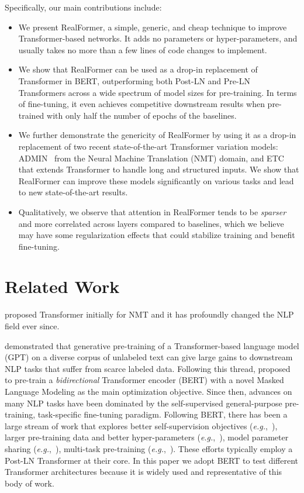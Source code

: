 \documentclass[11pt,a4paper]{article}
\begin{document}
Specifically, our main contributions include:
\begin{itemize}
\item We present RealFormer, a simple, generic, and cheap technique to improve Transformer-based networks. It adds no parameters or hyper-parameters, and usually takes no more than a few lines of code changes to implement.
\item We show that RealFormer can be used as a drop-in replacement of Transformer in BERT, outperforming both Post-LN and Pre-LN Transformers across a wide spectrum of model sizes for pre-training. In terms of fine-tuning, it even achieves competitive downstream results when pre-trained with only half the number of epochs of the baselines.
\item We further demonstrate the genericity of RealFormer by using it as a drop-in replacement of two recent state-of-the-art Transformer variation models: ADMIN~\citep{Liu-2020-admin} from the Neural Machine Translation (NMT) domain, and ETC~\citep{Ainslie-2020-etc} that extends Transformer to handle long and structured inputs. We show that RealFormer can improve these models significantly on various tasks and lead to new state-of-the-art results.
\item Qualitatively, we observe that attention in RealFormer tends to be \emph{sparser} and more correlated across layers compared to baselines, which we believe may have some regularization effects that could stabilize training and benefit fine-tuning.
\end{itemize}


\section{Related Work}
\citet{Vaswani-2017-attention} proposed Transformer initially for NMT and it has profoundly changed the NLP field ever since. 

\citet{Radford-2018-gpt1} demonstrated that generative pre-training of a Transformer-based language model (GPT) on a diverse corpus of unlabeled text can give large gains to downstream NLP tasks that suffer from scarce labeled data. Following this thread, \citet{Devlin-2019-bert} proposed to pre-train a \emph{bidirectional} Transformer encoder (BERT) with a novel Masked Language Modeling as the main optimization objective. Since then, advances on many NLP tasks have been dominated by the self-supervised general-purpose pre-training, task-specific fine-tuning paradigm.
Following BERT, there has been a large stream of work that explores better self-supervision objectives (\emph{e.g.},~\citet{Yang-2019-xlnet,Clark-2020-electra}), larger pre-training data and better hyper-parameters (\emph{e.g.},~\citet{Liu-2019-roberta}), model parameter sharing (\emph{e.g.},~\citet{Lan-2019-albert}), multi-task pre-training (\emph{e.g.},~\citet{Sun-2019-ernie2,Raffel-2019-t5}).
These efforts typically employ a Post-LN Transformer at their core. In this paper we adopt BERT to test different Transformer architectures because it is widely used and representative of this body of work.
\end{document}
